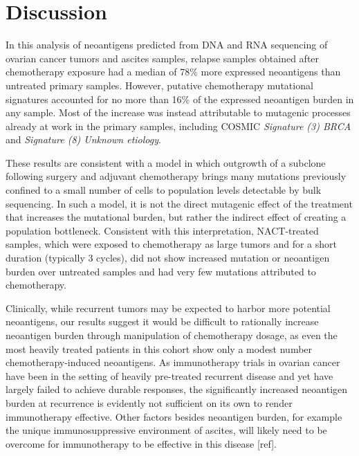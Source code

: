 \documentclass[linenumbers]{bmcart}
\begin{document}
\section*{Discussion}
In this analysis of neoantigens predicted from DNA and RNA sequencing of ovarian cancer tumors and ascites samples, relapse samples obtained after chemotherapy exposure had a median of 78\% more expressed neoantigens than untreated primary samples. However, putative chemotherapy mutational signatures accounted for no more than 16\% of the expressed neoantigen burden in any sample. Most of the increase was instead attributable to mutagenic processes already at work in the primary samples, including COSMIC \textit{Signature (3) BRCA} and \textit{Signature (8) Unknown etiology}.

These results are consistent with a model in which outgrowth of a subclone following surgery and adjuvant chemotherapy brings many mutations previously confined to a small number of cells to population levels detectable by bulk sequencing. In such a model, it is not the direct mutagenic effect of the treatment that increases the mutational burden, but rather the indirect effect of creating a population bottleneck. Consistent with this interpretation, NACT-treated samples, which were exposed to chemotherapy as large tumors and for a short duration (typically 3 cycles), did not show increased mutation or neoantigen burden over untreated samples and had very few mutations attributed to chemotherapy.

Clinically, while recurrent tumors may be expected to harbor more potential neoantigens, our results suggest it would be difficult to rationally increase neoantigen burden through manipulation of chemotherapy dosage, as even the most heavily treated patients in this cohort show only a modest number chemotherapy-induced neoantigens. As immunotherapy trials in ovarian cancer have been in the setting of heavily pre-treated recurrent disease and yet have largely failed to achieve durable responses, the significantly increased neoantigen burden at recurrence is evidently not sufficient on its own to render immunotherapy effective. Other factors besides neoantigen burden, for example the unique immunosuppressive environment of ascites, will likely need to be overcome for immunotherapy to be effective in this disease [ref]. 

\end{document}
